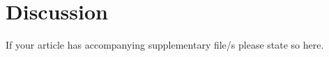 \documentclass[pdflatex,sn-mathphys]{sn-jnl}%
\theoremstyle{thmstyleone}%
\theoremstyle{thmstyletwo}%
\theoremstyle{thmstylethree}%
\begin{document}
%
%
%

\section*{Discussion}\label{discussion}


%
%

\backmatter


If your article has accompanying supplementary file/s please state so here. 
\end{document}
